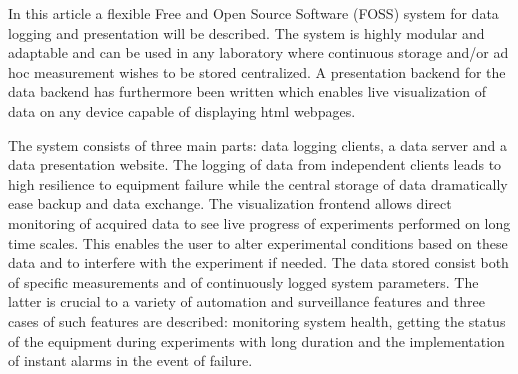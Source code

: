 In this article a flexible Free and Open Source Software (FOSS) system for data
logging and presentation will be described. The system is highly modular and
adaptable and can be used in any laboratory where continuous storage and/or ad
hoc measurement wishes to be stored centralized. A presentation backend for the
data backend has furthermore been written which enables live visualization of
data on any device capable of displaying html webpages.

The system consists of three main parts: data logging clients, a data server
and a data presentation website. The logging of data from independent clients
leads to high resilience to equipment failure while the central storage of
data dramatically ease backup and data exchange. The visualization frontend
allows direct monitoring of acquired data to see live progress of experiments
performed on long time scales. This enables the user to alter experimental
conditions based on these data and to interfere with the experiment if needed.
The data stored consist both of specific measurements and of continuously
logged system parameters. The latter is crucial to a variety of automation and
surveillance features and three cases of such features are described:
monitoring system health, getting the status of the equipment during
experiments with long duration and the implementation of instant alarms in the
event of failure.
